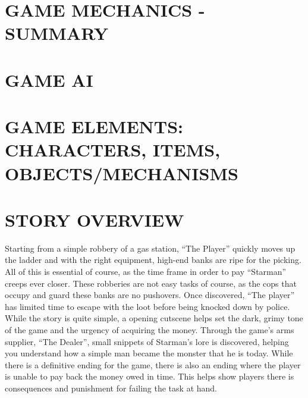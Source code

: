 \documentclass{article}
\begin{document}
\section{GAME MECHANICS - SUMMARY \label{mechanicssumm}}

\section{GAME AI \label{ai}}

\section{GAME ELEMENTS: CHARACTERS, ITEMS, OBJECTS/MECHANISMS \label{elements}}

\section{STORY OVERVIEW \label{storyover}}
Starting from a simple robbery of a gas station, “The Player” quickly moves up the ladder and with the right equipment, high-end banks are ripe for the picking. All of this is essential of course, as the time frame in order to pay “Starman” creeps ever closer.
\bigbreak
These robberies are not easy tasks of course, as the cops that occupy and guard these banks are no pushovers. Once discovered, “The player” has limited time to escape with the loot before being knocked down by police.
\bigbreak
While the story is quite simple, a opening cutscene helps set the dark, grimy tone of the game and the urgency of acquiring the money. Through the game’s arms supplier, “The Dealer”, small snippets of Starman’s lore is discovered, helping you understand how a simple man became the monster that he is today.
\bigbreak
While there is a definitive ending for the game, there is also an ending where the player is unable to pay back the money owed in time. This helps show players there is consequences and punishment for failing the task at hand.
\end{document}
